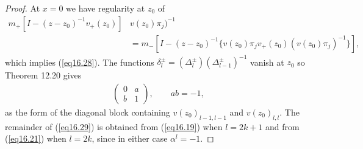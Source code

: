 \documentclass{surv-l}
\theoremstyle{plain}
\theoremstyle{definition}
\numberwithin{equation}{chapter}
\begin{document}
\begin{proof}
At $x=0$ we have regularity at $z_{0}$ of
\begin{align*}
m_{+}[I- (z -z_{0})^{-1}v_{+}(z_{0})]&v(z_{0})\pi_{j})^{-1}\\
&=m_{-}[I-(z-z_{0})^{-1}\{v(z_{0})\pi_{j}v_{+}(z_{0})(v(z_{0})\pi_{j})^{-1}\}],
\end{align*}
which implies (\ref{eq16.28}). The functions $\delta_{l}^{\pm}=(\Delta_{l}^{\pm})(\Delta_{l-1}^{\pm})^{-1}$ vanish at $z_{0}$ so Theorem 12.20 gives
\begin{align*}
\left(\begin{array}{ll}
0 & a\\
b & 1
\end{array}\right),\qquad ab=-1,
\end{align*}
as the form of the diagonal block containing $v(z_{0})_{l-1,l-1}$ and $v(z_{0})_{l,l}$. The remainder of (\ref{eq16.29}) is obtained from (\ref{eq16.19}) when $l=2k+1$ and from (\ref{eq16.21}) when $l=2k$, since in either case $\alpha^{l}=-1$.



\end{proof}
\end{document}
